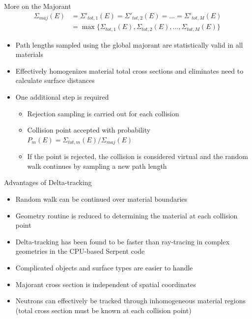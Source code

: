\documentclass[xcolor=x11names, compress, handout]{beamer}
\renewcommand{\(}{\begin{columns}}
\renewcommand{\)}{\end{columns}}
\newcommand{\<}[1]{\begin{column}{#1}}
\renewcommand{\>}{\end{column}}
\begin{document}
\begin{frame}{More on the Majorant \cite{serpent}}
	\begin{equation*}
        \begin{aligned}
        \Sigma_{maj}(E) &= \Sigma'_{tot,1}(E) = \Sigma'_{tot,2}(E) = \ldots = \Sigma'_{tot,M}(E) \\
        & = \max\{\Sigma_{tot,1}(E), \Sigma_{tot,2}(E),\ldots, \Sigma_{tot,M}(E)\}
        \end{aligned}
        \end{equation*}
	\begin{itemize}
	\pause
	\item{Path lengths sampled using the global majorant are statistically valid in all materials}
	\pause
	\item{Effectively homogenizes material total cross sections and eliminates need to calculate 
	surface distances}
	\pause
	\item{One additional step is required}
		\begin{itemize}
		\pause
		\item{Rejection sampling is carried out for each collision}
		\item{Collision point accepted with probability 
		$P_{m}(E) = \Sigma_{tot,m}(E)/\Sigma_{maj}(E)$}
		\pause
		\item{If the point is rejected, the collision is considered virtual and the random walk 
		continues by sampling a new path length}
		\end{itemize}
	\end{itemize}
\end{frame}


\begin{frame}{Advantages of Delta-tracking \cite{serpent}}
	\begin{itemize}
	\item{Random walk can be continued over material boundaries}
	\pause
	\item{Geometry routine is reduced to determining the material at each collision point}
	\pause
	\item{Delta-tracking has been found to be faster than ray-tracing in complex geometries in the 
	CPU-based Serpent code}
	\pause
	\item{Complicated objects and surface types are easier to handle}
	\pause
	\item{Majorant cross section is independent of spatial coordinates}
	\pause
	\item{Neutrons can effectively be tracked through inhomogeneous material regions (total cross section must be known at each collision point)}
	\end{itemize}
\end{frame}
\end{document}
